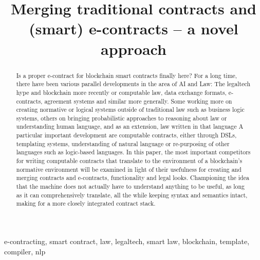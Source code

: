 \documentclass[conference]{IEEEtran}
\begin{document}
\title{Merging traditional contracts and (smart) e-contracts – a novel approach}

\author{
}

\maketitle

\begin{abstract}
Is a proper e-contract for blockchain smart contracts finally here? For a long time, there have been various parallel developments in the area of AI and Law: The legaltech hype and blockchain more recently or computable law, data exchange formats, e-contracts, agreement systems and similar more generally. 
Some working more on creating normative or logical systems outside of traditional law such as business logic systems, others on bringing probabilistic approaches to reasoning about law or understanding human language, and as an extension, law written in that language
A particular important development are computable contracts, either through DSLs, templating systems, understanding of natural language or re-purposing of other languages such as logic-based languages. In this paper, the most important competitors for writing computable contracts that translate to the environment of a blockchain's normative environment will be examined in light of their usefulness for creating and merging contracts and e-contracts, functionality and legal looks. Championing the idea that the machine does not actually have to understand anything to be useful, as long as it can comprehensively translate, all the while keeping syntax and semantics intact, making for a more closely integrated contract stack.
\end{abstract}

\begin{IEEEkeywords}
e-contracting, smart contract, law, legaltech, smart law, blockchain, template, compiler, nlp
\end{IEEEkeywords}
\end{document}

